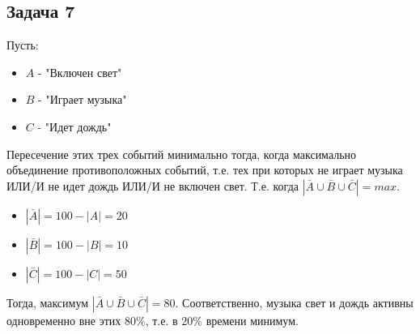 \documentclass{article}
\begin{document}
 \begin{center}
 	\subsection*{Задача 7}
 \end{center}
 Пусть:
 \begin{itemize}
 	\item{}$ A $ - "Включен свет" 
 	\item{}$ B $ - "Играет музыка"
 	\item{}$ C $ - "Идет дождь"
\end{itemize}
Пересечение этих трех событий минимально тогда, когда максимально объединение противоположных событий, т.е. тех при которых не играет музыка ИЛИ/И не идет дождь ИЛИ/И не включен свет. Т.е. когда $|\bar{A} \cup \bar{B} \cup \bar{C}| = max$.
 \begin{itemize}
 	\item{}$ |\bar{A}| = 100 - |A| = 20 $ 
 	\item{}$ |\bar{B}| = 100 - |B| = 10 $
 	\item{}$ |\bar{C}| = 100 - |C| = 50 $
 \end{itemize}
 Тогда, максимум $|\bar{A} \cup \bar{B} \cup \bar{C}| = 80$.
 Соответственно, музыка свет и дождь активны одновременно вне этих $80\%$, т.е. в $20\%$ времени минимум.
 
\end{document}
